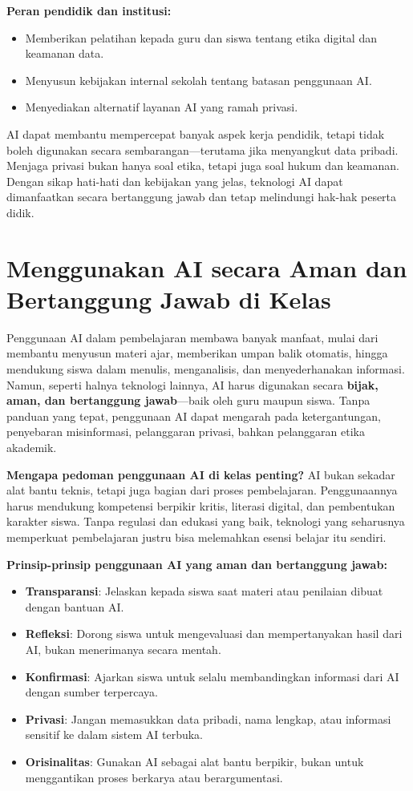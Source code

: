\textbf{Peran pendidik dan institusi:}
\begin{itemize}
	\item Memberikan pelatihan kepada guru dan siswa tentang etika digital dan keamanan data.
	\item Menyusun kebijakan internal sekolah tentang batasan penggunaan AI.
	\item Menyediakan alternatif layanan AI yang ramah privasi.
\end{itemize}

AI dapat membantu mempercepat banyak aspek kerja pendidik, tetapi tidak boleh digunakan secara sembarangan—terutama jika menyangkut data pribadi. Menjaga privasi bukan hanya soal etika, tetapi juga soal hukum dan keamanan. Dengan sikap hati-hati dan kebijakan yang jelas, teknologi AI dapat dimanfaatkan secara bertanggung jawab dan tetap melindungi hak-hak peserta didik.

\section{Menggunakan AI secara Aman dan Bertanggung Jawab di Kelas}

Penggunaan AI dalam pembelajaran membawa banyak manfaat, mulai dari membantu menyusun materi ajar, memberikan umpan balik otomatis, hingga mendukung siswa dalam menulis, menganalisis, dan menyederhanakan informasi. Namun, seperti halnya teknologi lainnya, AI harus digunakan secara \textbf{bijak, aman, dan bertanggung jawab}—baik oleh guru maupun siswa. Tanpa panduan yang tepat, penggunaan AI dapat mengarah pada ketergantungan, penyebaran misinformasi, pelanggaran privasi, bahkan pelanggaran etika akademik.

\textbf{Mengapa pedoman penggunaan AI di kelas penting?}  
AI bukan sekadar alat bantu teknis, tetapi juga bagian dari proses pembelajaran. Penggunaannya harus mendukung kompetensi berpikir kritis, literasi digital, dan pembentukan karakter siswa. Tanpa regulasi dan edukasi yang baik, teknologi yang seharusnya memperkuat pembelajaran justru bisa melemahkan esensi belajar itu sendiri.

\textbf{Prinsip-prinsip penggunaan AI yang aman dan bertanggung jawab:}
\begin{itemize}
	\item \textbf{Transparansi}: Jelaskan kepada siswa saat materi atau penilaian dibuat dengan bantuan AI.
	\item \textbf{Refleksi}: Dorong siswa untuk mengevaluasi dan mempertanyakan hasil dari AI, bukan menerimanya secara mentah.
	\item \textbf{Konfirmasi}: Ajarkan siswa untuk selalu membandingkan informasi dari AI dengan sumber terpercaya.
	\item \textbf{Privasi}: Jangan memasukkan data pribadi, nama lengkap, atau informasi sensitif ke dalam sistem AI terbuka.
	\item \textbf{Orisinalitas}: Gunakan AI sebagai alat bantu berpikir, bukan untuk menggantikan proses berkarya atau berargumentasi.
\end{itemize}

